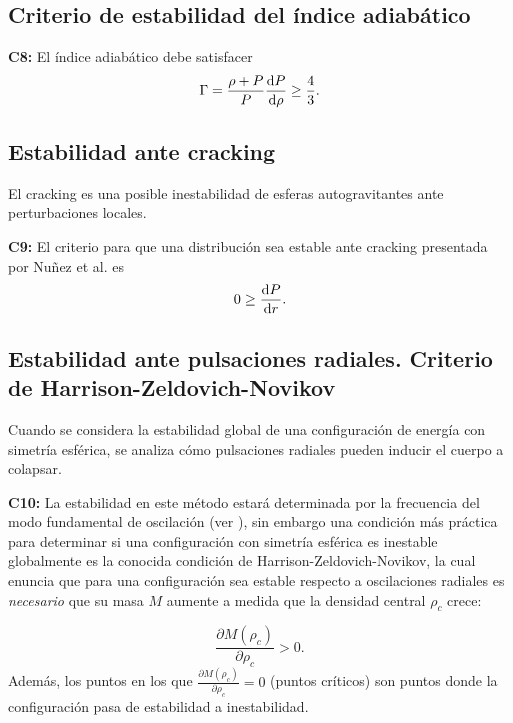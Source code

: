 \subsection*{Criterio de estabilidad del índice adiabático }

\textbf{C8:} El índice adiabático debe satisfacer
\begin{equation}
    \Gamma = \frac { \rho + P  } { P } \dv{P}{\rho} \geq \frac{4}{3}.
\end{equation}

\subsection*{Estabilidad ante cracking}
El cracking es una posible inestabilidad de esferas autogravitantes ante perturbaciones locales.

\textbf{C9:} El criterio para que una distribución sea estable ante cracking presentada por Nuñez et al. \cite{Gonzalez2014CrackingSpheres} es
\begin{equation}
    0 \geq \dv{P}{r}.
\end{equation}

\subsection*{Estabilidad ante pulsaciones radiales. Criterio de Harrison-Zeldovich-Novikov}
Cuando se considera la estabilidad global de una configuraci\'on de energía con simetría esférica, se analiza cómo pulsaciones radiales pueden inducir el cuerpo a colapsar. 

\textbf{C10:} La estabilidad en este método estará determinada por la frecuencia del modo fundamental de oscilación (ver \cite{Haensel2007NeutronStructure,Shapiro1983}), sin embargo una condición más práctica para determinar si una configuraci\'on con simetría esférica es inestable globalmente es la conocida condición de Harrison-Zeldovich-Novikov, la cual enuncia que para una configuración sea estable respecto a oscilaciones radiales es \emph{necesario} que su masa $M$ aumente a medida que la densidad central $\rho_{c}$ crece: 

\begin{equation}
    \frac { \partial M \left( \rho _ { c } \right) } { \partial \rho _ { c } } > 0.
\end{equation}
Además, los puntos en los que $\frac { \partial M \left( \rho _ { c } \right) } { \partial \rho _ { c } } = 0$ (puntos críticos) son puntos donde la configuraci\'on pasa de estabilidad a inestabilidad.



